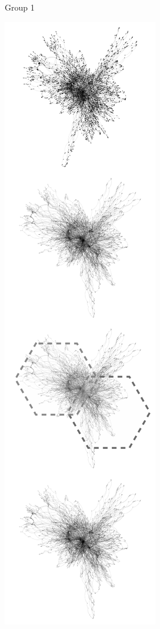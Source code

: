 \begin{figure}[H]
\begin{subfigure}[b]{.2\textwidth}
     \caption{Group 1}
     \end{subfigure}
     \begin{subfigure}[b]{.2\textwidth}
         \centering
     \includegraphics[width=\textwidth]{figures_c1/beijingtest/2.png}

\end{subfigure}
\end{figure}
